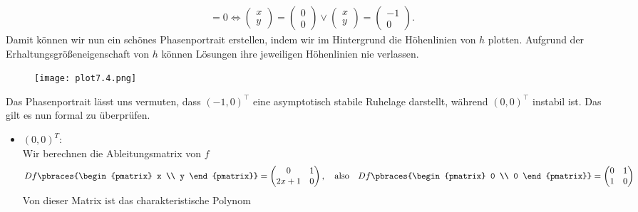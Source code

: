 \begin{solution}
\begin{align*}
    = 0 \Leftrightarrow
    \begin{pmatrix}
      x \\ y
    \end{pmatrix}
    =
    \begin{pmatrix}
      0 \\ 0
    \end{pmatrix}
    \lor
    \begin{pmatrix}
      x \\ y
    \end{pmatrix}
    =
    \begin{pmatrix}
      -1 \\ 0
    \end{pmatrix}.
  \end{align*}
  Damit können wir nun ein schönes Phasenportrait erstellen, indem wir im
  Hintergrund die Höhenlinien von $h$ plotten. Aufgrund der Erhaltungsgrößeneigenschaft
  von $h$ können Lösungen ihre jeweiligen Höhenlinien nie verlassen.
  \FloatBarrier
  \begin{figure}
      \centering
      \texttt{[image: plot7.4.png]}
  \end{figure}
  \FloatBarrier
  Das Phasenportrait lässt uns vermuten, dass $(-1,0)^{\top}$ eine asymptotisch stabile Ruhelage darstellt,
  während $(0,0)^{\top}$ instabil ist.
  Das gilt es nun formal zu überprüfen.
  \begin{itemize}
    \item $(0, 0)^T$: \\
    Wir berechnen die Ableitungsmatrix von $f$
    \begin{align*}
      Df\pbraces{\begin{pmatrix}
        x \\ y
      \end{pmatrix}}
      =
      \begin{pmatrix}
        0 & 1 \\
        2x+1 & 0
      \end{pmatrix},
      \quad \textrm{also} \quad
      Df\pbraces{\begin{pmatrix}
        0 \\ 0
      \end{pmatrix}}
      =
      \begin{pmatrix}
        0 & 1 \\
        1 & 0
      \end{pmatrix}
    \end{align*}
    Von dieser Matrix ist das charakteristische Polynom

\end{itemize}
\end{solution}
